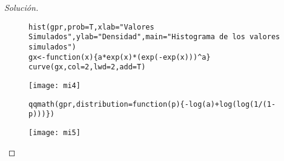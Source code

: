 \documentclass[11pt]{article}
\renewcommand{\=}[1]{\stackrel{#1}{=}} %
\newenvironment{sol}
{\begin{proof}[Solución]}
	{\end{proof}}
\theoremstyle{definition}
\theoremstyle{remark}
\begin{document}
\begin{itemize}
\begin{sol}
\newpage
\begin{figure}[h]
	\hspace*{0.9cm}\begin{minipage}{10cm}
		{
			\begin{lstlisting}[style=myRstyle, caption={Verificación mediante histograma / GUMBEL POTENCIA RECÍPROCO.}]
hist(gpr,prob=T,xlab="Valores Simulados",ylab="Densidad",main="Histograma de los valores simulados")
gx<-function(x){a*exp(x)*(exp(-exp(x)))^a}
curve(gx,col=2,lwd=2,add=T)
			\end{lstlisting}
		}			
	\end{minipage}
	\begin{minipage}{6cm}
		\texttt{[image: mi4]}
	\end{minipage}
\end{figure}
\begin{figure}[h]
	\hspace*{0.9cm}\begin{minipage}{10cm}
		{
			\begin{lstlisting}[style=myRstyle, caption={Verificación mediante gráfica de cuantiles / GUMBEL POTENCIA RECÍPROCO.}]
qqmath(gpr,distribution=function(p){-log(a)+log(log(1/(1-p)))})
			\end{lstlisting}
		}			
	\end{minipage}
	\begin{minipage}{6cm}
		\texttt{[image: mi5]}
	\end{minipage}
\end{figure}


\end{sol}
\end{itemize}
\end{document}
